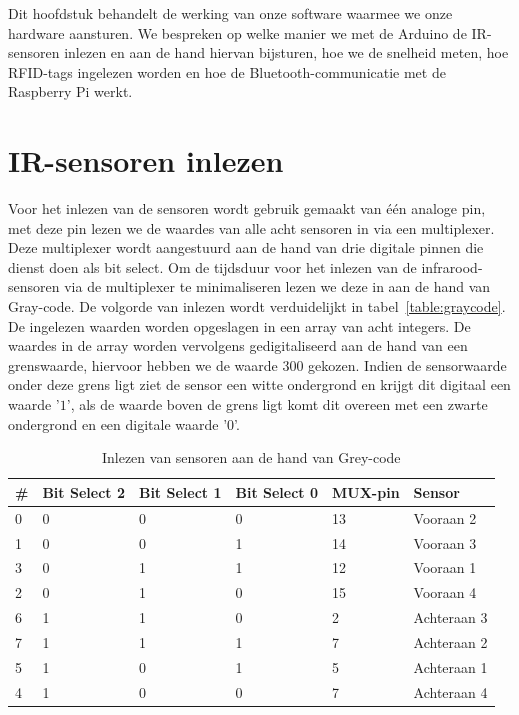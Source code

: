 Dit hoofdstuk behandelt de werking van onze software waarmee we onze hardware aansturen. We bespreken op welke manier we met de Arduino de IR-sensoren inlezen en aan de hand hiervan bijsturen, hoe we de snelheid meten, hoe RFID-tags ingelezen worden en hoe de Bluetooth-communicatie met de Raspberry Pi werkt.

\section{IR-sensoren inlezen}
Voor het inlezen van de sensoren wordt gebruik gemaakt van \'e\'en analoge pin, met deze pin lezen we de waardes van alle acht sensoren in via een multiplexer. Deze multiplexer wordt aangestuurd aan de hand van drie digitale pinnen die dienst doen als bit select. Om de tijdsduur voor het inlezen van de infrarood-sensoren via de multiplexer te minimaliseren lezen we deze in aan de hand van Gray-code. De volgorde van inlezen wordt verduidelijkt in tabel~\vref{table:graycode}. De ingelezen waarden worden opgeslagen in een array van acht integers. De waardes in de array worden vervolgens gedigitaliseerd aan de hand van een grenswaarde, hiervoor hebben we de waarde $300$ gekozen. Indien de sensorwaarde onder deze grens ligt ziet de sensor een witte ondergrond en krijgt dit digitaal een waarde '$1$', als de waarde boven de grens ligt komt dit overeen met een zwarte ondergrond en een digitale waarde '$0$'. 

\begin{table}[H]
	\centering
	\begin{tabular}{|l|l|l|l|l|l|}
		\hline
		\# & Bit Select 2 & Bit Select 1 & Bit Select 0 & MUX-pin & Sensor      \\ \hline
		0  & 0            & 0            & 0            & 13      & Vooraan 2   \\ \hline
		1  & 0            & 0            & 1            & 14      & Vooraan 3   \\ \hline
		3  & 0            & 1            & 1            & 12      & Vooraan 1   \\ \hline
		2  & 0            & 1            & 0            & 15      & Vooraan 4   \\ \hline
		6  & 1            & 1            & 0            & 2       & Achteraan 3 \\ \hline
		7  & 1            & 1            & 1            & 7       & Achteraan 2 \\ \hline
		5  & 1            & 0            & 1            & 5       & Achteraan 1 \\ \hline
		4  & 1            & 0            & 0            & 7       & Achteraan 4 \\ \hline
	\end{tabular}
	\caption{Inlezen van sensoren aan de hand van Grey-code}
	\label{table:graycode}
\end{table}

